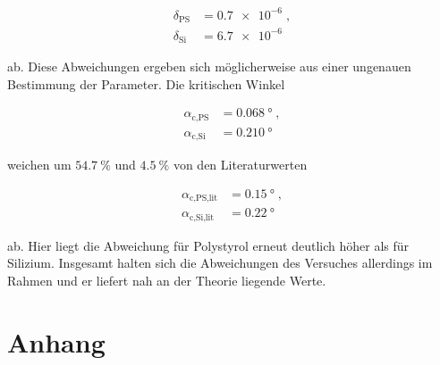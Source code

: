 \vspace{-15pt}
\begin{align*}
    \delta_\text{PS} &= \num{0.7e-6} \; , \\
    \delta_\text{Si} &= \num{6.7e-6} \;
\end{align*}

ab. Diese Abweichungen ergeben sich möglicherweise aus einer 
ungenauen Bestimmung der Parameter.
Die kritischen Winkel 

\vspace{-20pt}
\begin{align*}
    \alpha_\text{c,PS} &= \SI{0.068}{\degree} \; , \\
    \alpha_\text{c,Si} &= \SI{0.210}{\degree}
\end{align*}
 
weichen um  $\SI{54.7}{\percent}$ und 
$\SI{4.5}{\percent}$ von den Literaturwerten \cite{tolan}

\vspace{-20pt}
\begin{align*}
    \alpha_\text{c,PS,lit} &= \SI{0.15}{\degree} \; , \\
    \alpha_\text{c,Si,lit} &= \SI{0.22}{\degree}
\end{align*}

ab. Hier liegt die Abweichung für Polystyrol erneut deutlich höher
als für Silizium. Insgesamt halten sich die Abweichungen des Versuches allerdings im Rahmen
und er liefert nah an der Theorie liegende Werte.

\section{Anhang}

